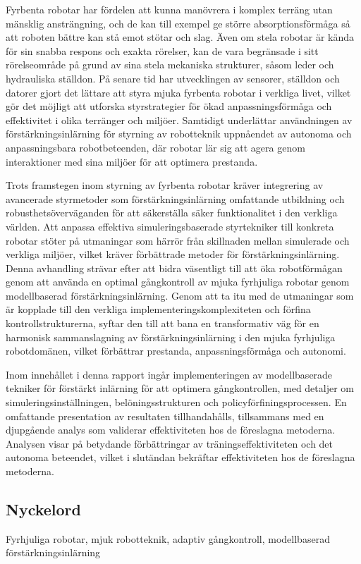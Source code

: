 Fyrbenta robotar har fördelen att kunna manövrera i komplex terräng utan mänsklig ansträngning, och de kan till exempel ge större absorptionsförmåga så att roboten bättre kan stå emot stötar och slag. Även om stela robotar är kända för sin snabba respons och exakta rörelser, kan de vara begränsade i sitt rörelseområde på grund av sina stela mekaniska strukturer, såsom leder och hydrauliska ställdon. På senare tid har utvecklingen av sensorer, ställdon och datorer gjort det lättare att styra mjuka fyrbenta robotar i verkliga livet, vilket gör det möjligt att utforska styrstrategier för ökad anpassningsförmåga och effektivitet i olika terränger och miljöer. Samtidigt underlättar användningen av förstärkningsinlärning för styrning av robotteknik uppnåendet av autonoma och anpassningsbara robotbeteenden, där robotar lär sig att agera genom interaktioner med sina miljöer för att optimera prestanda. 

Trots framstegen inom styrning av fyrbenta robotar kräver integrering av avancerade styrmetoder som förstärkningsinlärning omfattande utbildning och robusthetsöverväganden för att säkerställa säker funktionalitet i den verkliga världen. Att anpassa effektiva simuleringsbaserade styrtekniker till konkreta robotar stöter på utmaningar som härrör från skillnaden mellan simulerade och verkliga miljöer, vilket kräver förbättrade metoder för förstärkningsinlärning. Denna avhandling strävar efter att bidra väsentligt till att öka robotförmågan genom att använda en optimal gångkontroll av mjuka fyrhjuliga robotar genom modellbaserad förstärkningsinlärning. Genom att ta itu med de utmaningar som är kopplade till den verkliga implementeringskomplexiteten och förfina kontrollstrukturerna, syftar den till att bana en transformativ väg för en harmonisk sammanslagning av förstärkningsinlärning i den mjuka fyrhjuliga robotdomänen, vilket förbättrar prestanda, anpassningsförmåga och autonomi.

Inom innehållet i denna rapport ingår implementeringen av modellbaserade tekniker för förstärkt inlärning för att optimera gångkontrollen, med detaljer om simuleringsinställningen, belöningsstrukturen och policyförfiningsprocessen. En omfattande presentation av resultaten tillhandahålls, tillsammans med en djupgående analys som validerar effektiviteten hos de föreslagna metoderna. Analysen visar på betydande förbättringar av träningseffektiviteten och det autonoma beteendet, vilket i slutändan bekräftar effektiviteten hos de föreslagna metoderna. 

\subsection*{Nyckelord}
Fyrhjuliga robotar, mjuk robotteknik, adaptiv gångkontroll, modellbaserad förstärkningsinlärning


